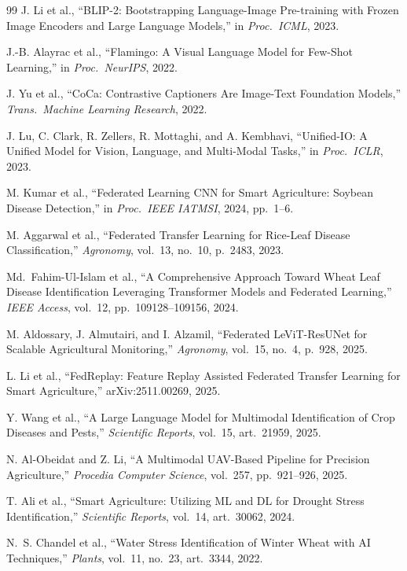 \documentclass[12pt, a4paper, oneside]{Thesis}
\begin{document}
\begin{thebibliography}{99}
J. Li et al.,
``BLIP-2: Bootstrapping Language-Image Pre-training with Frozen Image Encoders and Large Language Models,''
in \textit{Proc.\ ICML}, 2023.

J.-B. Alayrac et al.,
``Flamingo: A Visual Language Model for Few-Shot Learning,''
in \textit{Proc.\ NeurIPS}, 2022.

J. Yu et al.,
``CoCa: Contrastive Captioners Are Image-Text Foundation Models,''
\textit{Trans.\ Machine Learning Research}, 2022.

J. Lu, C. Clark, R. Zellers, R. Mottaghi, and A. Kembhavi,
``Unified-IO: A Unified Model for Vision, Language, and Multi-Modal Tasks,''
in \textit{Proc.\ ICLR}, 2023.

M. Kumar et al.,
``Federated Learning CNN for Smart Agriculture: Soybean Disease Detection,''
in \textit{Proc.\ IEEE IATMSI}, 2024, pp.\ 1--6.

M. Aggarwal et al.,
``Federated Transfer Learning for Rice-Leaf Disease Classification,''
\textit{Agronomy}, vol.\ 13, no.\ 10, p.\ 2483, 2023.

Md.\ Fahim-Ul-Islam et al.,
``A Comprehensive Approach Toward Wheat Leaf Disease Identification Leveraging Transformer Models and Federated Learning,''
\textit{IEEE Access}, vol.\ 12, pp.\ 109128--109156, 2024.

M. Aldossary, J. Almutairi, and I. Alzamil,
``Federated LeViT-ResUNet for Scalable Agricultural Monitoring,''
\textit{Agronomy}, vol.\ 15, no.\ 4, p.\ 928, 2025.

L. Li et al.,
``FedReplay: Feature Replay Assisted Federated Transfer Learning for Smart Agriculture,''
arXiv:2511.00269, 2025.

Y. Wang et al.,
``A Large Language Model for Multimodal Identification of Crop Diseases and Pests,''
\textit{Scientific Reports}, vol.\ 15, art.\ 21959, 2025.

N. Al-Obeidat and Z. Li,
``A Multimodal UAV-Based Pipeline for Precision Agriculture,''
\textit{Procedia Computer Science}, vol.\ 257, pp.\ 921--926, 2025.

T. Ali et al.,
``Smart Agriculture: Utilizing ML and DL for Drought Stress Identification,''
\textit{Scientific Reports}, vol.\ 14, art.\ 30062, 2024.

N.~S. Chandel et al.,
``Water Stress Identification of Winter Wheat with AI Techniques,''
\textit{Plants}, vol.\ 11, no.\ 23, art.\ 3344, 2022.


\end{thebibliography}
\end{document}
